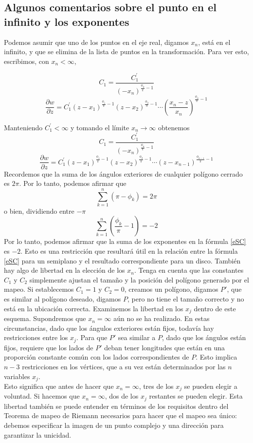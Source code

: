 \subsection{Algunos comentarios sobre el punto en el infinito y los exponentes}
	Podemos asumir que uno de los puntos en el eje real, digamos $x_n$, está en el infinito, y que se elimina de la lista de puntos en la transformación. Para ver esto, escribimos, con $x_n <\infty$,
	
	$$C_1=\dfrac{C_1^{'}}{(-x_n)^{\frac{\phi_n}{\pi}-1}}$$
	$$\dfrac{\partial w}{\partial z}=C_1^{'}(z-x_1)^{\frac{\phi_1}{\pi}-1}(z-x_2)^{\frac{\phi_2}{\pi}-1}\cdots\left(\dfrac{x_n-z}{x_n}\right)^{\frac{\phi_n}{\pi}-1}$$
	
	Manteniendo  $C_1^{'}<\infty$ y tomando el límite $x_n\rightarrow \infty$ obtenemos 
	$$C_1=\dfrac{C_1^{'}}{(-x_n)^{\frac{\phi_n}{\pi}-1}}$$
	$$\dfrac{\partial w}{\partial z}=C_1^{'}(z-x_1)^{\frac{\phi_1}{\pi}-1}(z-x_2)^{\frac{\phi_2}{\pi}-1}\cdots(z-x_{n-1})^{\frac{\phi_{n-1}}{\pi}-1}$$
Recordemos que la suma de los ángulos exteriores de cualquier polígono cerrado es $2\pi$. Por lo tanto, podemos afirmar que
	$$\sum_{k=1}^{n}(\pi-\phi_k)=2\pi$$
	o bien, dividiendo entre $-\pi$
	$$\sum_{k=1}^{n}\left(\frac{\phi_k}{\pi}-1\right)=-2$$
	Por lo tanto, podemos afirmar que la suma de los exponentes en la fórmula \ref{eSC} es $-2$. Esto es una restricción que resultará útil en la relación entre la fórmula \ref{eSC} para un semiplano y el resultado correspondiente para un disco. También hay algo de libertad en la elección de los $x_n$. Tenga en cuenta que las constantes $C_1$ y $C_2$ simplemente ajustan el tamaño y la posición del polígono generado por el mapeo. Si establecemos $C_1 = 1 $ y $C_2 = 0$, creamos un polígono, digamos $P'$, que es similar al polígono deseado, digamos $P$, pero no tiene el tamaño correcto y no está en la ubicación correcta. Examinemos la libertad en los $x_j$ dentro de este esquema. Supondremos que $x_n = \infty$ aún no se ha realizado. En estas circunstancias, dado que los ángulos exteriores están fijos, todavía hay restricciones entre los $x_j$. Para que $P'$ sea similar a $P$, dado que los ángulos están fijos, requiere que los lados de $P'$ deban tener longitudes que están en una proporción constante común con los lados correspondientes de $P$. Esto implica $n - 3$ restricciones en los vértices, que a su vez están determinados por las $n$ variables $x_j$.\\
	Esto significa que antes de hacer que $x_n = \infty$, tres de los $x_j$ se pueden elegir a voluntad. Si hacemos que $x_n = \infty$, dos de los $x_j$ restantes se pueden elegir. Esta libertad también se puede entender en términos de los requisitos dentro del Teorema de mapeo de Riemann necesarios para hacer que el mapeo sea único: debemos especificar la imagen de un punto complejo  y una dirección para garantizar la unicidad.
	
